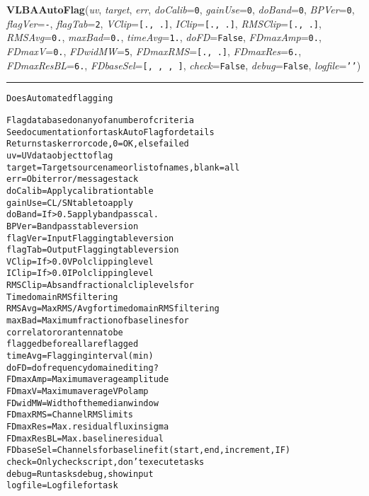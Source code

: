     \begin{boxedminipage}{\textwidth}

    \raggedright \textbf{VLBAAutoFlag}(\textit{uv}, \textit{target}, \textit{err}, \textit{doCalib}=\texttt{0\-}, \textit{gainUse}=\texttt{0\-}, \textit{doBand}=\texttt{0\-}, \textit{BPVer}=\texttt{0\-}, \textit{flagVer}=\texttt{-\-}, \textit{flagTab}=\texttt{2\-}, \textit{VClip}=\texttt{[\-.\-,\-~\-.\-]\-}, \textit{IClip}=\texttt{[\-.\-,\-~\-.\-]\-}, \textit{RMSClip}=\texttt{[\-.\-,\-~\-.\-]\-}, \textit{RMSAvg}=\texttt{0\-.\-}, \textit{maxBad}=\texttt{0\-.\-}, \textit{timeAvg}=\texttt{1\-.\-}, \textit{doFD}=\texttt{F\-a\-l\-s\-e\-}, \textit{FDmaxAmp}=\texttt{0\-.\-}, \textit{FDmaxV}=\texttt{0\-.\-}, \textit{FDwidMW}=\texttt{5\-}, \textit{FDmaxRMS}=\texttt{[\-.\-,\-~\-.\-]\-}, \textit{FDmaxRes}=\texttt{6\-.\-}, \textit{FDmaxResBL}=\texttt{6\-.\-}, \textit{FDbaseSel}=\texttt{[\-,\-~\-,\-~\-,\-~\-]\-}, \textit{check}=\texttt{F\-a\-l\-s\-e\-}, \textit{debug}=\texttt{F\-a\-l\-s\-e\-}, \textit{logfile}=\texttt{'\-'\-})

    \vspace{-1.5ex}

    \rule{\textwidth}{0.5\fboxrule}
\begin{alltt}
Does Automated flagging

Flag data based on any of a number of criteria
See documentation for task AutoFlag for details
Returns task error code, 0=OK, else failed
uv         = UV data object to flag
target     = Target source name or list of names, blank = all
err        = Obit error/message stack
doCalib    = Apply calibration table
gainUse    = CL/SN table to apply
doBand     = If {\textgreater}0.5 apply bandpass cal.
BPVer      = Bandpass table version
flagVer    = Input Flagging table version
flagTab    = Output Flagging table version
VClip      = If {\textgreater} 0.0 VPol clipping level
IClip      = If {\textgreater} 0.0 IPol clipping level
RMSClip    = Abs and fractional clip levels for
             Time domain RMS filtering
RMSAvg     = Max RMS/Avg for time domain RMS filtering
maxBad     = Maximum fraction of baselines for
             correlator or antenna to be
             flagged before all are flagged
timeAvg    = Flagging interval (min)
doFD       = do frequency domain editing?
FDmaxAmp   = Maximum average amplitude
FDmaxV     = Maximum average VPol amp
FDwidMW    = Width of the median window
FDmaxRMS   = Channel RMS limits
FDmaxRes   = Max. residual flux in sigma
FDmaxResBL = Max. baseline residual
FDbaseSel  =  Channels for baseline fit (start, end, increment, IF)
check      = Only check script, don't execute tasks
debug      = Run tasks debug, show input
logfile    = Log file for task\end{alltt}

    \vspace{1ex}

    \end{boxedminipage}

